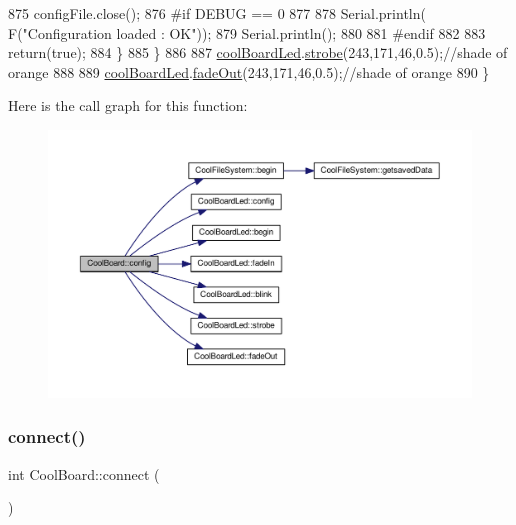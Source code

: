 \begin{DoxyCode}
875             configFile.close();
876 \textcolor{preprocessor}{            #if DEBUG == 0}
877 
878                 Serial.println( F(\textcolor{stringliteral}{"Configuration loaded : OK"}));
879                 Serial.println();
880 
881 \textcolor{preprocessor}{            #endif}
882 
883             \textcolor{keywordflow}{return}(\textcolor{keyword}{true});
884         \}
885     \}
886 
887     \hyperlink{class_cool_board_a1b1d3c684a5baa56b08486e192fd8e97}{coolBoardLed}.\hyperlink{class_cool_board_led_ad5f0de4c628cbfbf49896042831c64ad}{strobe}(243,171,46,0.5);\textcolor{comment}{//shade of orange}
888     
889     \hyperlink{class_cool_board_a1b1d3c684a5baa56b08486e192fd8e97}{coolBoardLed}.\hyperlink{class_cool_board_led_a93d545679237e8cc858324367149775c}{fadeOut}(243,171,46,0.5);\textcolor{comment}{//shade of orange               }
890 \}
\end{DoxyCode}
Here is the call graph for this function\+:
\nopagebreak
\begin{figure}[H]
\begin{center}
\leavevmode
\includegraphics[width=350pt]{d7/df9/class_cool_board_a583a874c09c07e70a6eb9229fc4beddb_cgraph}
\end{center}
\end{figure}
\mbox{\label{class_cool_board_a519de78b807f8ec6463ff484eb925918}} 
\subsubsection{\texorpdfstring{connect()}{connect()}}
{\footnotesize\ttfamily int Cool\+Board\+::connect (\begin{DoxyParamCaption}{ }\end{DoxyParamCaption})}

